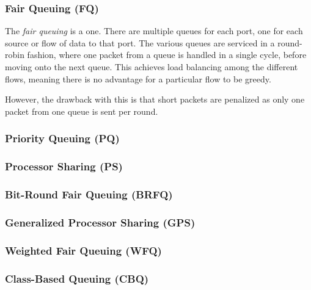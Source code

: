 \subsubsection{Fair Queuing (FQ)}\label{subsubsec:Fair_Queuing}
\begin{definition}\label{def:Fair_Queuing}
  The \emph{fair queuing}  is a  one.
  There are multiple queues for each port, one for each source or flow of data to that port.
  The various queues are serviced in a round-robin fashion, where one packet from a queue is handled in a single cycle, before moving onto the next queue.
  This achieves load balancing among the different flows, meaning there is no advantage for a particular flow to be greedy.

  However, the drawback with this is that short packets are penalized as only one packet from one queue is sent per round.
\end{definition}

\subsubsection{Priority Queuing (PQ)}\label{subsubsec:Priority_Queuing}
\subsubsection{Processor Sharing (PS)}\label{subsubsec:Processor_Sharing}
\subsubsection{Bit-Round Fair Queuing (BRFQ)}\label{subsubsec:Bit_Round_Fair_Queuing}
\subsubsection{Generalized Processor Sharing (GPS)}\label{subsubsec:Generalized_Processor_Sharing}
\subsubsection{Weighted Fair Queuing (WFQ)}\label{subsubsec:Weighted_Fair_Queuing}
\subsubsection{Class-Based Queuing (CBQ)}\label{subsubsec:Class_Based_Queuing}
